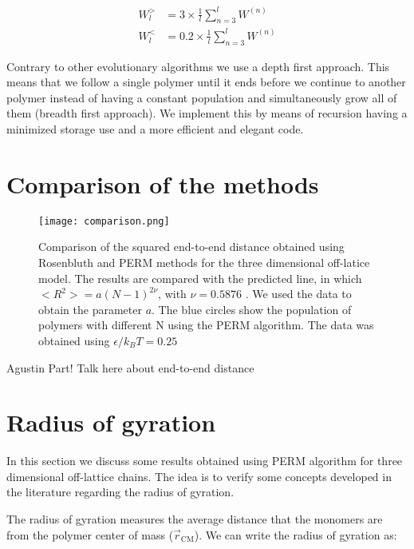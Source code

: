 \documentclass[aps,prl,reprint,groupedaddress]{revtex4-1}
\begin{document}
\begin{equation}
\begin{split}
	W_l^> &= 3 \times \frac{1}{l}\sum_{n=3}^l W^{(n)} \\
    W_l^< &= 0.2 \times \frac{1}{l}\sum_{n=3}^l W^{(n)}
\end{split}
\end{equation}

Contrary to other evolutionary algorithms we use a depth first approach. This means that we follow a single polymer until it ends before we continue to another polymer instead of having a constant population and simultaneously grow all of them (breadth first approach). We implement this by means of recursion having a minimized storage use and a more efficient and elegant code.\cite{grassberger} 




\section{Comparison of the methods}

\begin{figure}[ht]
	\texttt{[image: comparison.png]}
	\caption{Comparison of the squared end-to-end distance obtained using Rosenbluth and PERM methods for the three dimensional off-latice model. The results are compared with the predicted line, in which $<R^2> = a(N-1)^{2 \nu}$, with $\nu = 0.5876$ \cite{Clisby2010}. We used the data to obtain the parameter $a$. The blue circles show the population of polymers with different N using the PERM algorithm. The data was obtained using $\epsilon/k_B T = 0.25$\label{comparison}}
\end{figure}

Agustin Part! Talk here about end-to-end distance





\section{Radius of gyration}

In this section we discuss some results obtained using PERM algorithm for three dimensional off-lattice chains. The idea is to verify some concepts developed in the literature regarding the radius of gyration.

The radius of gyration measures the average distance that the monomers are from the polymer center of mass ($\vec{r}_{\text{CM}}$). We can write the radius of gyration as:
\end{document}
